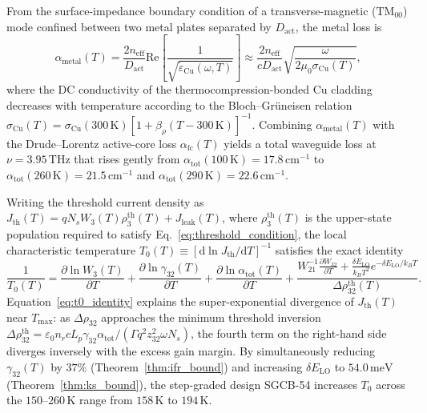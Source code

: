 \documentclass[11pt,letterpaper]{article}
\begin{document}
From the surface-impedance boundary condition of a transverse-magnetic ($\mathrm{TM}_{00}$) mode confined between two metal plates separated by $D_{\mathrm{act}}$, the metal loss is~\cite{Belkin2008,Vurgaftman2021}
\begin{equation}
\alpha_{\mathrm{metal}}(T) = \frac{2 n_{\mathrm{eff}}}{D_{\mathrm{act}}} \mathrm{Re}\!\left[\frac{1}{\sqrt{\tilde{\varepsilon}_{\mathrm{Cu}}(\omega, T)}}\right] \approx \frac{2 n_{\mathrm{eff}}}{c D_{\mathrm{act}}}\sqrt{\frac{\omega}{2\mu_0 \sigma_{\mathrm{Cu}}(T)}},
\label{eq:alpha_metal}
\end{equation}
where the DC conductivity of the thermocompression-bonded $\mathrm{Cu}$ cladding decreases with temperature according to the Bloch--Gr\"uneisen relation $\sigma_{\mathrm{Cu}}(T) = \sigma_{\mathrm{Cu}}(300\,\mathrm{K})[1 + \beta_\rho(T - 300\,\mathrm{K})]^{-1}$. Combining $\alpha_{\mathrm{metal}}(T)$ with the Drude--Lorentz active-core loss $\alpha_{\mathrm{fc}}(T)$ yields a total waveguide loss at $\nu = 3.95\,\mathrm{THz}$ that rises gently from $\alpha_{\mathrm{tot}}(100\,\mathrm{K}) = 17.8\,\mathrm{cm}^{-1}$ to $\alpha_{\mathrm{tot}}(260\,\mathrm{K}) = 21.5\,\mathrm{cm}^{-1}$ and $\alpha_{\mathrm{tot}}(290\,\mathrm{K}) = 22.6\,\mathrm{cm}^{-1}$.

Writing the threshold current density as $J_{\mathrm{th}}(T) = q N_s W_3(T)\rho_3^{\mathrm{th}}(T) + J_{\mathrm{leak}}(T)$, where $\rho_3^{\mathrm{th}}(T)$ is the upper-state population required to satisfy Eq.~\eqref{eq:threshold_condition}, the local characteristic temperature $T_0(T) \equiv [\mathrm{d}\ln J_{\mathrm{th}}/\mathrm{d}T]^{-1}$ satisfies the exact identity
\begin{equation}
\frac{1}{T_0(T)} = \frac{\partial \ln W_3(T)}{\partial T} + \frac{\partial \ln \gamma_{32}(T)}{\partial T} + \frac{\partial \ln \alpha_{\mathrm{tot}}(T)}{\partial T} + \frac{W_{21}^{-1}\frac{\partial W_{32}}{\partial T} + \frac{\delta E_{\mathrm{LO}}}{k_B T^2}e^{-\delta E_{\mathrm{LO}}/k_B T}}{\Delta\rho_{32}^{\mathrm{th}}(T)}.
\label{eq:t0_identity}
\end{equation}
Equation~\eqref{eq:t0_identity} explains the super-exponential divergence of $J_{\mathrm{th}}(T)$ near $T_{\max}$: as $\Delta\rho_{32}$ approaches the minimum threshold inversion $\Delta\rho_{32}^{\mathrm{th}} = \varepsilon_0 n_r c L_p \gamma_{32} \alpha_{\mathrm{tot}} / (\Gamma q^2 z_{32}^2 \omega N_s)$, the fourth term on the right-hand side diverges inversely with the excess gain margin. By simultaneously reducing $\gamma_{32}(T)$ by $37\%$ (Theorem~\ref{thm:ifr_bound}) and increasing $\delta E_{\mathrm{LO}}$ to $54.0\,\mathrm{meV}$ (Theorem~\ref{thm:ks_bound}), the step-graded design SGCB-54 increases $T_0$ across the $150\text{--}260\,\mathrm{K}$ range from $158\,\mathrm{K}$ to $194\,\mathrm{K}$.
\end{document}
